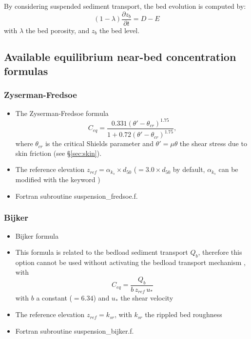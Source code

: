 By considering suspended sediment transport, the bed evolution is computed by: %
\begin{equation*}
(1-\lambda)\frac{\partial z_b}{\partial t} = D - E
\end{equation*}
with $\lambda$ the bed porosity, and $z_b$ the bed level.



\subsection{Available equilibrium near-bed concentration formulas}\label{sec:concform}
\subsubsection{Zyserman-Fredsoe}
\begin{itemize}
\item The Zyserman-Fredsoe formula~\cite{Zyserman} 
\begin{equation*}
C_{eq} =\frac{0.331(\theta'-\theta_{cr})^{1.75}}{1+0.72(\theta'-\theta_{cr})^{1.75}},
\end{equation*}
where $\theta_{cr}$ is the critical Shields parameter and $\theta'= \mu\theta$ the shear stress due to skin friction (see \S\ref{sec:skin}).
\item The reference elevation $z_{ref}=\alpha_{k_s}\times d_{50}$ ($=3.0\times d_{50}$ by default, $\alpha_{k_s}$ can be modified with the keyword )
\item Fortran subroutine {\ttfamily suspension\_fredsoe.f}.
\end{itemize}

\subsubsection{Bijker}
\begin{itemize}
\item Bijker formula 
\item This formula is related to the bedload sediment transport $Q_b$, therefore this option cannot be used without activating the bedload transport mechanism , with 
\begin{equation*}
C_{eq} =\frac{Q_b}{b\,z_{ref}\,u_*}
\end{equation*}
with $b$ a constant ($=6.34$) and $u_*$ the shear velocity
\item The reference elevation $z_{ref}=k_{sr}$, with $k_{sr}$ the rippled bed roughness
\item Fortran subroutine {\ttfamily suspension\_bijker.f}.
\end{itemize}

